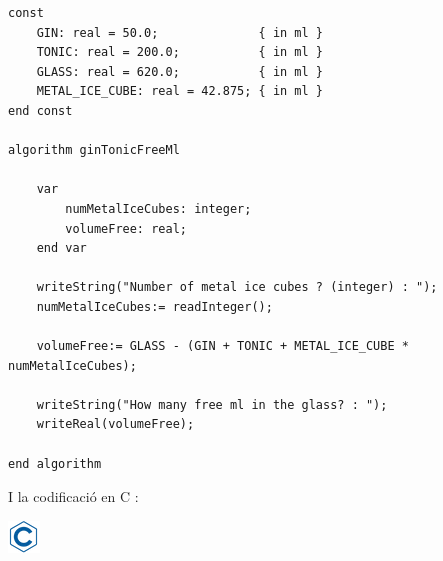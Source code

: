\documentclass[]{book}
\newenvironment{Shaded}{\begin{snugshade}}{\end{snugshade}}
\newcommand{\DataTypeTok}[1]{\textcolor[rgb]{0.13,0.29,0.53}{#1}}
\newcommand{\DecValTok}[1]{\textcolor[rgb]{0.00,0.00,0.81}{#1}}
\newcommand{\SpecialCharTok}[1]{\textcolor[rgb]{0.00,0.00,0.00}{#1}}
\newcommand{\StringTok}[1]{\textcolor[rgb]{0.31,0.60,0.02}{#1}}
\newcommand{\ImportTok}[1]{#1}
\newcommand{\CommentTok}[1]{\textcolor[rgb]{0.56,0.35,0.01}{\textit{#1}}}
\newcommand{\ControlFlowTok}[1]{\textcolor[rgb]{0.13,0.29,0.53}{\textbf{#1}}}
\newcommand{\PreprocessorTok}[1]{\textcolor[rgb]{0.56,0.35,0.01}{\textit{#1}}}
\newcommand{\NormalTok}[1]{#1}
\begin{document}
\begin{verbatim}
const
    GIN: real = 50.0;              { in ml }
    TONIC: real = 200.0;           { in ml }
    GLASS: real = 620.0;           { in ml }
    METAL_ICE_CUBE: real = 42.875; { in ml }
end const

algorithm ginTonicFreeMl

    var
        numMetalIceCubes: integer;
        volumeFree: real;
    end var

    writeString("Number of metal ice cubes ? (integer) : ");
    numMetalIceCubes:= readInteger();

    volumeFree:= GLASS - (GIN + TONIC + METAL_ICE_CUBE * numMetalIceCubes);

    writeString("How many free ml in the glass? : ");
    writeReal(volumeFree);

end algorithm
\end{verbatim}

I la codificació en C :

\includegraphics{./img/c.png}

\begin{Shaded}
\end{Shaded}
\end{document}

